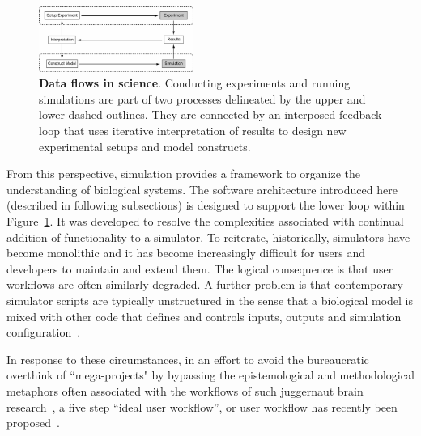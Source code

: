 \documentclass[11pt,3p,twocolumn]{JMN}
\begin{document}
\begin{figure}[h!t]
  \begin{center}
    \includegraphics[width=0.45\textwidth]{figures/exp-sim.pdf}
  \end{center}
  \caption{ \small{\textbf{Data flows in science}. Conducting experiments and running simulations are part of two processes delineated by the upper and lower dashed outlines. They are connected by an interposed feedback loop that uses iterative interpretation of results to design new experimental setups and model constructs.}}
    \label{fig:exp-sim}
\end{figure}

From this perspective, simulation provides a framework to organize the understanding of biological systems. The software architecture introduced here (described in following subsections) is designed to support the lower loop within Figure~\ref{fig:exp-sim}. It was developed to resolve the complexities associated with continual addition of functionality to a simulator. To reiterate, historically, simulators have become monolithic and it has become increasingly difficult for users and developers to maintain and extend them. The logical consequence is that user workflows are often similarly degraded. A further problem is that contemporary simulator scripts are typically unstructured in the sense that a biological model is mixed with other code that defines and controls inputs, outputs and simulation configuration~\citep{cannon07:_inter}.

In response to these circumstances, in an effort to avoid the bureaucratic overthink of ``mega-projects" by bypassing the epistemological and methodological metaphors often associated with the workflows of such juggernaut brain research~\citep{fan19}, a five step “ideal user workflow”, or user workflow has recently been proposed~\citep{cornelis12}. 
\end{document}
